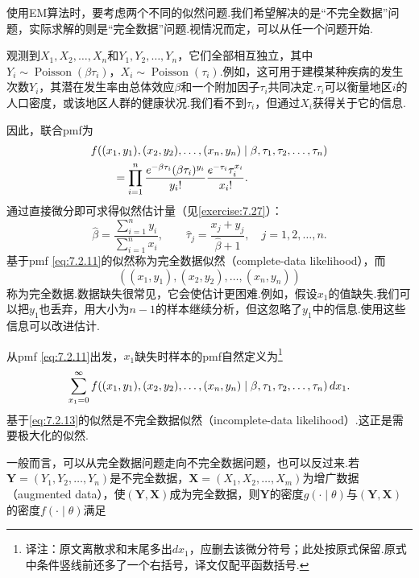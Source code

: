 使用EM算法时，要考虑两个不同的似然问题.我们希望解决的是“不完全数据”问题，实际求解的则是“完全数据”问题.视情况而定，可以从任一个问题开始.
\begin{example}[多个Poisson率]\label{ex:7.2.17}
观测到$X_1,X_2,\ldots,X_n$和$Y_1,Y_2,\ldots,Y_n$，它们全部相互独立，其中$Y_i\sim\operatorname{Poisson}(\beta\tau_i)$，$X_i\sim\operatorname{Poisson}(\tau_i)$.例如，这可用于建模某种疾病的发生次数$Y_i$，其潜在发生率由总体效应$\beta$和一个附加因子$\tau_i$共同决定.$\tau_i$可以衡量地区$i$的人口密度，或该地区人群的健康状况.我们看不到$\tau_i$，但通过$X_i$获得关于它的信息.

因此，联合pmf为
\begin{equation}\label{eq:7.2.11}\index{SI0009@完整数据似然}
\begin{aligned}
&f((x_1,y_1),(x_2,y_2),\ldots,(x_n,y_n)\mid\beta,\tau_1,\tau_2,\ldots,\tau_n)\\
&\qquad=\prod_{i=1}^n\frac{e^{-\beta\tau_i}(\beta\tau_i)^{y_i}}{y_i!}\frac{e^{-\tau_i}\tau_i^{x_i}}{x_i!}.
\end{aligned}
\end{equation}
通过直接微分即可求得似然估计量（见\autoref{exercise:7.27}）：
\begin{equation}\label{eq:7.2.12}
\widehat\beta=\frac{\sum_{i=1}^ny_i}{\sum_{i=1}^nx_i},\qquad\widehat\tau_j=\frac{x_j+y_j}{\widehat\beta+1},\quad j=1,2,\ldots,n.
\end{equation}
基于pmf \eqref{eq:7.2.11}的似然称为完全数据似然（complete-data likelihood），而
$$((x_1,y_1),(x_2,y_2),\ldots,(x_n,y_n))$$
称为完全数据.数据缺失很常见，它会使估计更困难.例如，假设$x_1$的值缺失.我们可以把$y_1$也丢弃，用大小为$n-1$的样本继续分析，但这忽略了$y_1$中的信息.使用这些信息可以改进估计.

从pmf \eqref{eq:7.2.11}出发，$x_1$缺失时样本的pmf自然定义为\footnote{译注：原文离散求和末尾多出$dx_1$，应删去该微分符号；此处按原式保留.原式中条件竖线前还多了一个右括号，译文仅配平函数括号.}
\begin{equation}\label{eq:7.2.13}\index{SI0012@不完整数据似然}
\sum_{x_1=0}^\infty f((x_1,y_1),(x_2,y_2),\ldots,(x_n,y_n)\mid\beta,\tau_1,\tau_2,\ldots,\tau_n)\,dx_1.
\end{equation}
基于\eqref{eq:7.2.13}的似然是不完全数据似然（incomplete-data likelihood）.这正是需要极大化的似然.
\end{example}
一般而言，可以从完全数据问题走向不完全数据问题，也可以反过来.若$\boldsymbol Y=(Y_1,Y_2,\ldots,Y_n)$是不完全数据，$\boldsymbol X=(X_1,X_2,\ldots,X_m)$为增广数据（augmented data），使$(\boldsymbol Y,\boldsymbol X)$成为完全数据，则$\boldsymbol Y$的密度$g(\cdot\mid\theta)$与$(\boldsymbol Y,\boldsymbol X)$的密度$f(\cdot\mid\theta)$满足
